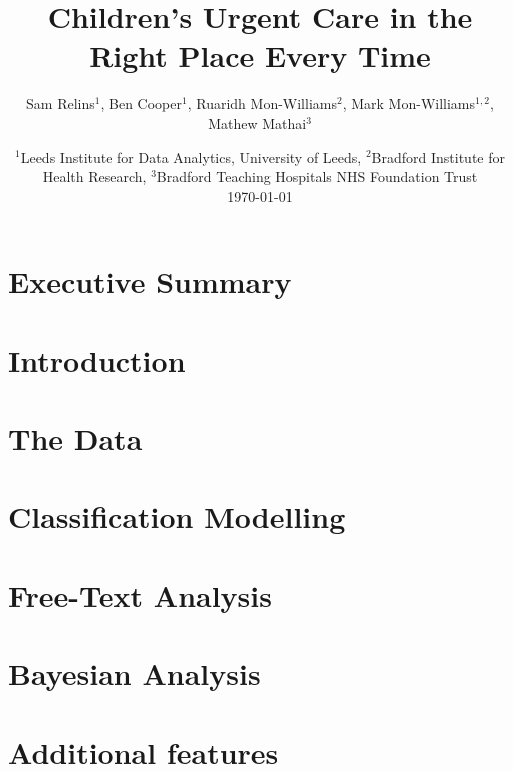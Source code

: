 \documentclass[11pt]{report}
\title{Children's Urgent Care in the Right Place Every Time}
\author{Sam Relins$^1$, Ben Cooper$^1$, Ruaridh Mon-Williams$^2$, Mark Mon-Williams$^{1,2}$, Mathew Mathai$^3$}
\date{%
    $^1$Leeds Institute for Data Analytics, University of Leeds, $^2$Bradford Institute for Health Research, $^3$Bradford Teaching Hospitals NHS Foundation Trust\\[2ex]%
    \today
}
\begin{document}
    \maketitle
    \tableofcontents
    
	\listoffigures

	\listoftables


    \chapter*{Executive Summary}\label{ch:executive-summary}
    

    \chapter{Introduction}\label{ch:introduction}
    

    \chapter{The Data}\label{ch:the-data}
    

    \chapter{Classification Modelling}\label{ch:classification-modelling}
    

    \chapter{Free-Text Analysis}\label{ch:free-text-analysis}
    

    \chapter{Bayesian Analysis}\label{ch:bayesian-analysis}
    
    
    \chapter{Additional features}\label{ch:additional-features}
    
    
\end{document}
